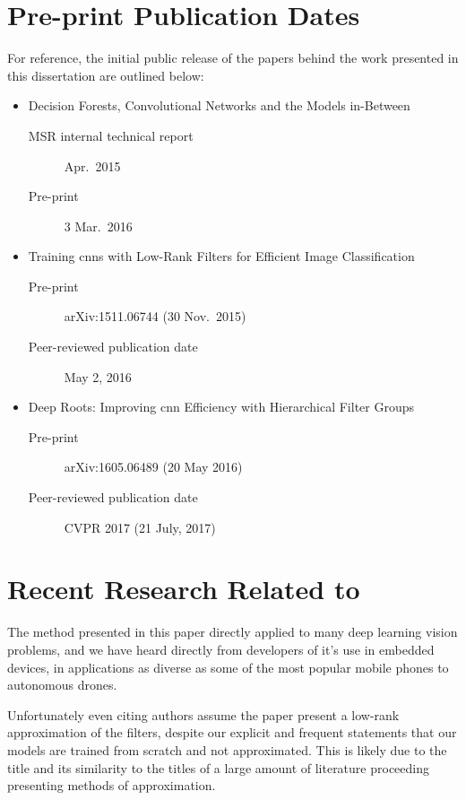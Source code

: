 \documentclass[thesis]{subfiles}
\begin{document}
\section{Pre-print Publication Dates}
For reference, the initial public release of the papers behind the work presented in this dissertation are outlined below:
\begin{itemize}
    \item Decision Forests, Convolutional Networks and the Models in-Between~\citep{Ioannou2015}
    \begin{description}
        \item[MSR internal technical report] Apr.\, 2015
        \item[Pre-print] 3 Mar.\ 2016
    \end{description}
    \item Training \glspl{cnn} with Low-Rank Filters for Efficient Image Classification~\citep{Ioannou2016}
    \begin{description}
        \item[Pre-print] arXiv:1511.06744 (30 Nov.\ 2015)
        \item[Peer-reviewed publication date] May 2, 2016
    \end{description}
    \item Deep Roots: Improving \gls{cnn} Efficiency with Hierarchical Filter Groups~\citep{ioannou2016e}
    \begin{description}
        \item[Pre-print] arXiv:1605.06489 (20 May 2016)
        \item[Peer-reviewed publication date] CVPR 2017 (21 July, 2017)
    \end{description}
\end{itemize}

\section{Recent Research Related to }
The method presented in this paper directly applied to many deep learning vision problems, and we have heard directly from developers of it's use in embedded devices, in applications as diverse as some of the most popular mobile phones to autonomous drones.

Unfortunately even citing authors assume the paper present a low-rank approximation of the filters, despite our explicit and frequent statements that our models are trained from scratch and not approximated. This is likely due to the title and its similarity to the titles of a large amount of literature proceeding presenting methods of approximation.
\end{document}
